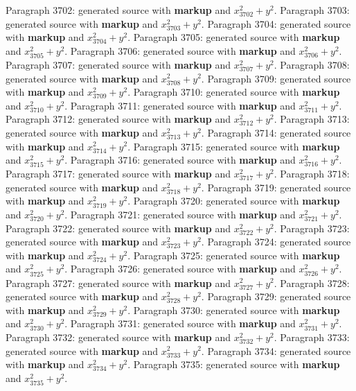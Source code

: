 \documentclass{article}
\begin{document}
Paragraph 3702: generated source with \textbf{markup} and $x_{3702}^2 + y^2$.
Paragraph 3703: generated source with \textbf{markup} and $x_{3703}^2 + y^2$.
Paragraph 3704: generated source with \textbf{markup} and $x_{3704}^2 + y^2$.
Paragraph 3705: generated source with \textbf{markup} and $x_{3705}^2 + y^2$.
Paragraph 3706: generated source with \textbf{markup} and $x_{3706}^2 + y^2$.
Paragraph 3707: generated source with \textbf{markup} and $x_{3707}^2 + y^2$.
Paragraph 3708: generated source with \textbf{markup} and $x_{3708}^2 + y^2$.
Paragraph 3709: generated source with \textbf{markup} and $x_{3709}^2 + y^2$.
Paragraph 3710: generated source with \textbf{markup} and $x_{3710}^2 + y^2$.
Paragraph 3711: generated source with \textbf{markup} and $x_{3711}^2 + y^2$.
Paragraph 3712: generated source with \textbf{markup} and $x_{3712}^2 + y^2$.
Paragraph 3713: generated source with \textbf{markup} and $x_{3713}^2 + y^2$.
Paragraph 3714: generated source with \textbf{markup} and $x_{3714}^2 + y^2$.
Paragraph 3715: generated source with \textbf{markup} and $x_{3715}^2 + y^2$.
Paragraph 3716: generated source with \textbf{markup} and $x_{3716}^2 + y^2$.
Paragraph 3717: generated source with \textbf{markup} and $x_{3717}^2 + y^2$.
Paragraph 3718: generated source with \textbf{markup} and $x_{3718}^2 + y^2$.
Paragraph 3719: generated source with \textbf{markup} and $x_{3719}^2 + y^2$.
Paragraph 3720: generated source with \textbf{markup} and $x_{3720}^2 + y^2$.
Paragraph 3721: generated source with \textbf{markup} and $x_{3721}^2 + y^2$.
Paragraph 3722: generated source with \textbf{markup} and $x_{3722}^2 + y^2$.
Paragraph 3723: generated source with \textbf{markup} and $x_{3723}^2 + y^2$.
Paragraph 3724: generated source with \textbf{markup} and $x_{3724}^2 + y^2$.
Paragraph 3725: generated source with \textbf{markup} and $x_{3725}^2 + y^2$.
Paragraph 3726: generated source with \textbf{markup} and $x_{3726}^2 + y^2$.
Paragraph 3727: generated source with \textbf{markup} and $x_{3727}^2 + y^2$.
Paragraph 3728: generated source with \textbf{markup} and $x_{3728}^2 + y^2$.
Paragraph 3729: generated source with \textbf{markup} and $x_{3729}^2 + y^2$.
Paragraph 3730: generated source with \textbf{markup} and $x_{3730}^2 + y^2$.
Paragraph 3731: generated source with \textbf{markup} and $x_{3731}^2 + y^2$.
Paragraph 3732: generated source with \textbf{markup} and $x_{3732}^2 + y^2$.
Paragraph 3733: generated source with \textbf{markup} and $x_{3733}^2 + y^2$.
Paragraph 3734: generated source with \textbf{markup} and $x_{3734}^2 + y^2$.
Paragraph 3735: generated source with \textbf{markup} and $x_{3735}^2 + y^2$.
\end{document}
